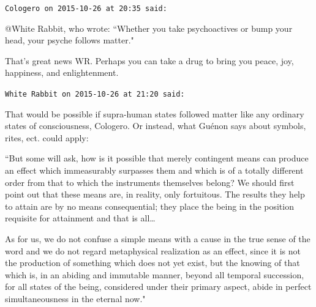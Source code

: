 \begin{footnotesize}
\begin{sffamily}
\hfill

\texttt{Cologero on 2015-10-26 at 20:35 said: }

@White Rabbit, who wrote: ``Whether you take psychoactives or bump your head, your psyche follows matter."

That's great news WR. Perhaps you can take a drug to bring you peace, joy, happiness, and enlightenment.


\hfill

\texttt{White Rabbit on 2015-10-26 at 21:20 said: }

That would be possible if supra-human states followed matter like any ordinary states of consciousness, Cologero. Or instead, what Guénon says about symbols, rites, ect. could apply:

``But some will ask, how is it possible that merely contingent means can produce an effect which immeasurably surpasses them and which is of a totally different order from that to which the instruments themselves belong? We should first point out that these means are, in reality, only fortuitous. The results they help to attain are by no means consequential; they place the being in the position requisite for attainment and that is all…

As for us, we do not confuse a simple means with a cause in the true sense of the word and we do not regard metaphysical realization as an effect, since it is not the production of something which does not yet exist, but the knowing of that which is, in an abiding and immutable manner, beyond all temporal succession, for all states of the being, considered under their primary aspect, abide in perfect simultaneousness in the eternal now."


\hfill


\end{sffamily}\end{footnotesize}
